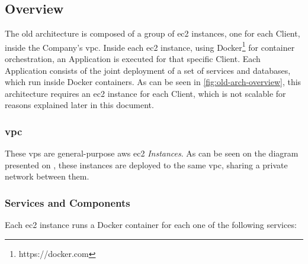 \subsection{Overview}\label{methodology:ss:overview}

The old architecture is composed of a group of \gls{ec2} instances, one for each Client, inside the Company's \gls{vpc}. Inside each \gls{ec2} instance, using Docker\footnote{https://docker.com}\label{foot:docker} for container orchestration, an Application is executed for that specific Client. Each Application consists of the joint deployment of a set of services and databases, which run inside Docker containers. As can be seen in \cref{fig:old-arch-overview}, this architecture requires an \gls{ec2} instance for each Client, which is not scalable for reasons explained later in this document.


\subsubsection{\gls{vpc}}\label{methodology:sss:vpc}

These \gls{vps} are general-purpose \gls{aws} \gls{ec2} \textit{Instances}. As can be seen on the diagram presented on , these instances are deployed to the same \gls{vpc}, sharing a private network between them.

\subsubsection{Services and Components}\label{methodology:sss:services-and-components}





Each \gls{ec2} instance runs a Docker container for each one of the following services:
 
